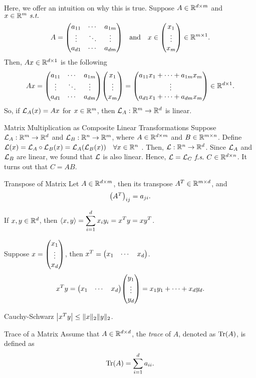 \begin{prf}
	Here, we offer an intuition on why this is true. Suppose $A\in{\mathbb{R}}^{d\times m}$ and $x\in{\mathbb{R}}^{m}\emph{\ s.t.\ }$ \[A=\mqty(a_{11}&\cdots&a_{1m}\\\vdots&\ddots&\vdots\\a_{d1}&\cdots&a_{dm})\quad\text{and}\quad x\in\mqty(x_1\\\vdots\\x_m)\in\R^{m\times1}.\]	 Then, $Ax\in{\mathbb{R}}^{d\times1}$ is the following \[Ax=\mqty(a_{11}&\cdots&a_{1m}\\\vdots&\ddots&\vdots\\a_{d1}&\cdots&a_{dm})\mqty(x_1\\\vdots\\x_m)=\mqty(a_{11}x_1+\cdots+a_{1m}x_m\\\vdots\\a_{d1}x_1+\cdots+a_{dm}x_m)\in\R^{d\times1}.\] So, if $\mathcal{L}_A(x)=Ax$ for $x\in{\mathbb{R}}^m$, then $\mathcal{L}_A:{\mathbb{R}}^m\to{\mathbb{R}}^d$ is linear. 
\end{prf}
\begin{thm}{Matrix Multiplication as Composite Linear Transformations}
	Suppose $\mathcal{L}_A:{\mathbb{R}}^m\to{\mathbb{R}}^d$ and $\mathcal{L}_B:{\mathbb{R}}^n\to{\mathbb{R}}^m$, where $A\in{\mathbb{R}}^{d\times m}$ and $B\in{\mathbb{R}}^{m\times n}$. Define $\mathcal{L}(x)=\mathcal{L}_A\circ\mathcal{L}_B(x)=\mathcal{L}_A(\mathcal{L}_B(x))\quad\forall x\in{\mathbb{R}}^n$	. Then, $\mathcal{L}:{\mathbb{R}}^n\to{\mathbb{R}}^d$. Since $\mathcal{L}_A$ and $\mathcal{L}_B$ are linear, we found that $\mathcal{L}$ is also linear. Hence, $\mathcal{L}=\mathcal{L}_C\emph{\ f.s.\ } C\in{\mathbb{R}}^{d\times n}$. It turns out that $C=AB$.
\end{thm}
\begin{df}{Transpose of Matrix}
	Let $A\in{\mathbb{R}}^{d\times m}$, then its transpose $A^T\in{\mathbb{R}}^{m\times d}$, and \[\mqty(A^T)_{ij}=a_{ji}.\]	
\end{df}
\begin{cor}{}
	If $x,y\in{\mathbb{R}}^d$, then $\left\langle x, y \right\rangle=\displaystyle\sum_{i=1}^dx_iy_i=x^Ty=xy^T$.
\end{cor}
\begin{prf}
	Suppose $x=\mqty(x_1\\\vdots\\x_d)$, then $x^T=\mqty(x_1&\cdots&x_d)$.\[x^Ty=\mqty(x_1&\cdots&x_d)\mqty(y_1\\\vdots\\y_d)=x_1y_1+\cdots+x_dy_d.\]	
\end{prf}
\begin{cor}{Cauchy-Schwarz}
	$\qty|x^Ty|\leq\|x\|_2\|y\|_2$.	
\end{cor}
\begin{df}{Trace of a Matrix}
	Assume that $A\in{\mathbb{R}}^{d\times d}$, the \textit{trace} of $A$, denoted as $\Tr(A)$, is defined as \[\Tr(A)=\sum_{i=1}^da_{ii}.\]	
\end{df}
